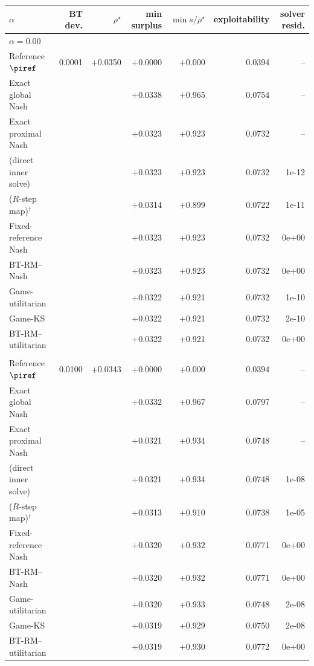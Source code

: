 \begin{tabular}{l r r r r r r}
\toprule
$\alpha$ & BT dev. & $\rho^\star$ & min surplus & $\min s/\rho^\star$ & exploitability & solver resid. \\
\midrule
\multicolumn{7}{l}{\textit{$\alpha=0.00$}} \\
\quad Reference $\piref$ & 0.0001 & +0.0350 & +0.0000 & +0.000 & 0.0394 & -- \\
\quad Exact global Nash &  &  & +0.0338 & +0.965 & 0.0754 & -- \\
\quad Exact proximal Nash &  &  & +0.0323 & +0.923 & 0.0732 & -- \\
\quad \NBPO{} (direct inner solve) &  &  & +0.0323 & +0.923 & 0.0732 & 1e-12 \\
\quad \NBPO{} ($R$-step map)$^{\dagger}$ &  &  & +0.0314 & +0.899 & 0.0722 & 1e-11 \\
\quad Fixed-reference Nash &  &  & +0.0323 & +0.923 & 0.0732 & 0e+00 \\
\quad BT-RM--Nash &  &  & +0.0323 & +0.923 & 0.0732 & 0e+00 \\
\quad Game-utilitarian &  &  & +0.0322 & +0.921 & 0.0732 & 1e-10 \\
\quad Game-KS &  &  & +0.0322 & +0.921 & 0.0732 & 2e-10 \\
\quad BT-RM--utilitarian &  &  & +0.0322 & +0.921 & 0.0732 & 0e+00 \\
\addlinespace
\multicolumn{7}{l}{\textit{$\alpha=0.25$}} \\
\quad Reference $\piref$ & 0.0100 & +0.0343 & +0.0000 & +0.000 & 0.0394 & -- \\
\quad Exact global Nash &  &  & +0.0332 & +0.967 & 0.0797 & -- \\
\quad Exact proximal Nash &  &  & +0.0321 & +0.934 & 0.0748 & -- \\
\quad \NBPO{} (direct inner solve) &  &  & +0.0321 & +0.934 & 0.0748 & 1e-08 \\
\quad \NBPO{} ($R$-step map)$^{\dagger}$ &  &  & +0.0313 & +0.910 & 0.0738 & 1e-05 \\
\quad Fixed-reference Nash &  &  & +0.0320 & +0.932 & 0.0771 & 0e+00 \\
\quad BT-RM--Nash &  &  & +0.0320 & +0.932 & 0.0771 & 0e+00 \\
\quad Game-utilitarian &  &  & +0.0320 & +0.933 & 0.0748 & 2e-08 \\
\quad Game-KS &  &  & +0.0319 & +0.929 & 0.0750 & 2e-08 \\
\quad BT-RM--utilitarian &  &  & +0.0319 & +0.930 & 0.0772 & 0e+00 \\

\end{tabular}
